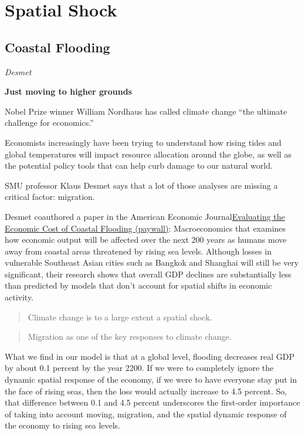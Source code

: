 \documentclass[
]{book}
\begin{document}
\hypertarget{spatial-shock}{%
\section{Spatial Shock}\label{spatial-shock}}

\hypertarget{coastal-flooding}{%
\subsection{Coastal Flooding}\label{coastal-flooding}}

\emph{Desmet}

\textbf{Just moving to higher grounds}

Nobel Prize winner William Nordhaus has called climate change ``the ultimate challenge for economics.''

Economists increasingly have been trying to understand how rising tides and global temperatures will impact resource allocation around the globe, as well as the potential policy tools that can help curb damage to our natural world.

SMU professor Klaus Desmet says that a lot of those analyses are missing a critical factor: migration.

Desmet coauthored a paper in the American Economic Journal\href{https://www.aeaweb.org/articles?id=10.1257/mac.20180366}{Evaluating the Economic Cost of Coastal Flooding (paywall)}: Macroeconomics that examines how economic output will be affected over the next 200 years as humans move away from coastal areas threatened by rising sea levels. Although losses in vulnerable Southeast Asian cities such as Bangkok and Shanghai will still be very significant, their research shows that overall GDP declines are substantially less than predicted by models that don't account for spatial shifts in economic activity.

\begin{quote}
Climate change is to a large extent a spatial shock.
\end{quote}

\begin{quote}
Migration as one of the key responses to climate change.
\end{quote}

What we find in our model is that at a global level, flooding decreases real GDP by about 0.1 percent by the year 2200. If we were to completely ignore the dynamic spatial response of the economy, if we were to have everyone stay put in the face of rising seas, then the loss would actually increase to 4.5 percent. So, that difference between 0.1 and 4.5 percent underscores the first-order importance of taking into account moving, migration, and the spatial dynamic response of the economy to rising sea levels.
\end{document}
